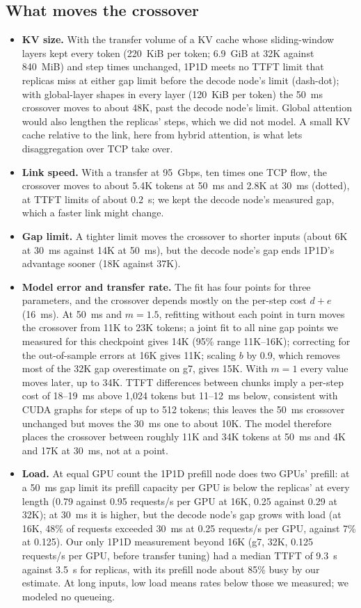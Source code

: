 \documentclass[11pt]{article}
\begin{document}
\subsection{What moves the crossover}\label{sec:moves}
\begin{itemize}
  \item \textbf{KV size.} With the transfer volume of a KV cache whose sliding-window layers kept every token (220~KiB per token; 6.9~GiB at 32K against 840~MiB) and step times unchanged, 1P1D meets no TTFT limit that replicas miss at either gap limit before the decode node's limit (dash-dot); with global-layer shapes in every layer (120~KiB per token) the 50~ms crossover moves to about 48K, past the decode node's limit. Global attention would also lengthen the replicas' steps, which we did not model. A small KV cache relative to the link, here from hybrid attention, is what lets disaggregation over TCP take over.
  \item \textbf{Link speed.} With a transfer at 95~Gbps, ten times one TCP flow, the crossover moves to about 5.4K tokens at 50~ms and 2.8K at 30~ms (dotted), at TTFT limits of about 0.2~s; we kept the decode node's measured gap, which a faster link might change.
  \item \textbf{Gap limit.} A tighter limit moves the crossover to shorter inputs (about 6K at 30~ms against 14K at 50~ms), but the decode node's gap ends 1P1D's advantage sooner (18K against 37K).
  \item \textbf{Model error and transfer rate.} The fit has four points for three parameters, and the crossover depends mostly on the per-step cost $d + e$ (16~ms). At 50~ms and $m = 1.5$, refitting without each point in turn moves the crossover from 11K to 23K tokens; a joint fit to all nine gap points we measured for this checkpoint gives 14K (95\% range 11K--16K); correcting for the out-of-sample errors at 16K gives 11K; scaling $b$ by 0.9, which removes most of the 32K gap overestimate on g7, gives 15K. With $m = 1$ every value moves later, up to 34K. TTFT differences between chunks imply a per-step cost of 18--19~ms above 1,024 tokens but 11--12~ms below, consistent with CUDA graphs for steps of up to 512 tokens; this leaves the 50~ms crossover unchanged but moves the 30~ms one to about 10K. The model therefore places the crossover between roughly 11K and 34K tokens at 50~ms and 4K and 17K at 30~ms, not at a point.
  \item \textbf{Load.} At equal GPU count the 1P1D prefill node does two GPUs' prefill: at a 50~ms gap limit its prefill capacity per GPU is below the replicas' at every length (0.79 against 0.95 requests/s per GPU at 16K, 0.25 against 0.29 at 32K); at 30~ms it is higher, but the decode node's gap grows with load (at 16K, 48\% of requests exceeded 30~ms at 0.25 requests/s per GPU, against 7\% at 0.125). Our only 1P1D measurement beyond 16K (g7, 32K, 0.125 requests/s per GPU, before transfer tuning) had a median TTFT of 9.3~s against 3.5~s for replicas, with its prefill node about 85\% busy by our estimate. At long inputs, low load means rates below those we measured; we modeled no queueing.

\end{itemize}
\end{document}
